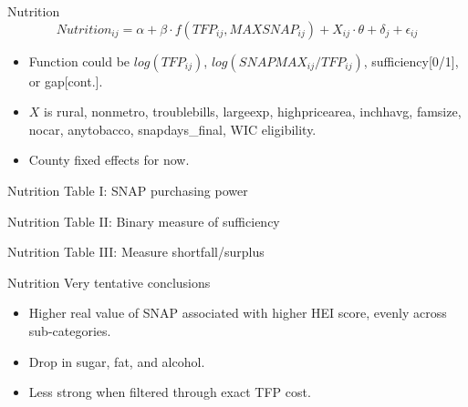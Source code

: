 \documentclass{beamer}
\begin{document}
\begin{frame}{Nutrition}
 $$Nutrition_{ij}=\alpha + \beta \cdot f(TFP_{ij}, MAXSNAP_{ij}) + X_{ij} \cdot \theta + \delta_{j}+\epsilon_{ij} $$
 
\begin{itemize}
\item Function could be $log (TFP_{ij})$, $log(SNAPMAX_{ij}/TFP_{ij})$, sufficiency[0/1], or gap[cont.].
\item $X$ is rural, nonmetro, troublebills, largeexp, highpricearea, inchhavg, famsize, nocar, anytobacco, snapdays\_final, WIC eligibility.
\item County fixed effects for now.
\end{itemize}
\end{frame}


\begin{frame}{Nutrition}
Table I: SNAP purchasing power
\end{frame}

\begin{frame}{Nutrition}
Table II: Binary measure of sufficiency
\end{frame}

\begin{frame}{Nutrition}
Table III: Measure shortfall/surplus
\end{frame}

\begin{frame}{Nutrition}
Very tentative conclusions
 
\begin{itemize}
\item Higher real value of SNAP associated with higher HEI score, evenly across sub-categories.
\item Drop in sugar, fat, and alcohol.
\item Less strong when filtered through exact TFP cost.
\end{itemize}
\end{frame}
\begin{frame}[plain]
\hspace{34mm}
\end{frame}
\end{document}
